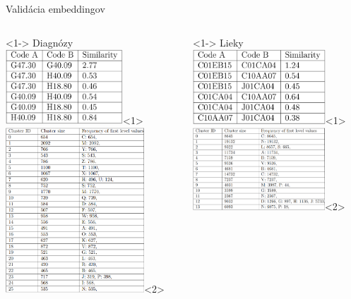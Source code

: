 \documentclass[slovak,10pt]{beamer}
\begin{document}
\begin{frame}{Validácia embeddingov}
	\begin{columns}[T]%
		\begin{column}{.48\textwidth}<1->%
			Diagnózy 
			\includegraphics[height=2.8cm]{images/diag_sim.png}<1>
			\includegraphics[height=6.2cm]{images/diag_clust.png}<2>
			
		\end{column}
		\hfill%
		\begin{column}{.48\textwidth}<1->%
			Lieky 
			\includegraphics[height=2.8cm]{images/drug_sim.png}<1>
			\includegraphics[height=3.1cm]{images/drug_clust.png}<2>
			
		\end{column}  
	\end{columns}
\end{frame}
\end{document}
